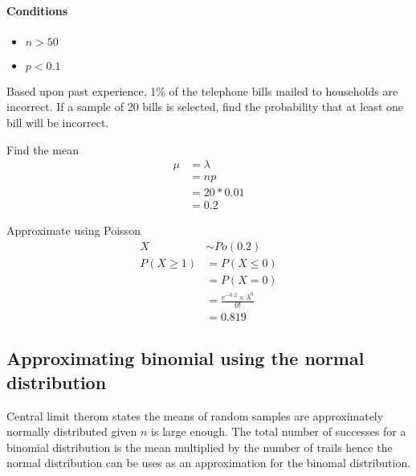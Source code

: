         \paragraph{Conditions}
        \begin{itemize}
            \item $n > 50$
            \item $p < 0.1$
        \end{itemize}

        \begin{example}
        {
        Based upon past experience, 1\% of the telephone bills mailed to households are incorrect. If a sample of 20 bills is selected, find the probability that at least one bill will be incorrect.
        }

        \begin{step}{Find the mean}
        \begin{align*}
        \mu &= \lambda\\
        &= np\\
        &= 20 * 0.01\\
        &= 0.2
        \end{align*}
        \end{step}

        \begin{step}{Approximate using Poisson}
        \begin{align*}
        X &\sim Po(0.2)\\
        P(X \geq 1) &= P(X \leq 0)\\
        &= P(X = 0)\\
        &= \frac{e^{-0.2} \times \lambda^0}{0!}\\
        &= 0.819
        \end{align*}
        \end{step}

        \end{example}


    \subsection{Approximating binomial using the normal distribution}
        Central limit therom states the means of random samples are approximately normally distributed given $n$ is large enough. The total number of successes for a binomial distribution is the mean multiplied by the number of trails hence the normal distribution can be uses as an approximation for the binomal distribution.

